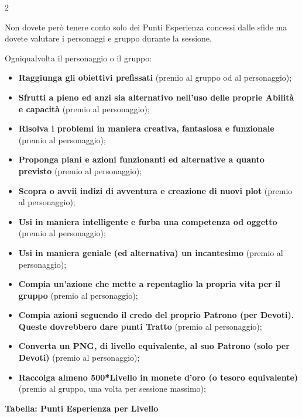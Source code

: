 \begin{multicols}{2}
\medskip

Non dovete però tenere conto solo dei Punti Esperienza concessi dalle sfide ma dovete valutare i personaggi e gruppo durante la sessione.

Ogniqualvolta il personaggio o il gruppo:\label{puntiesperienzabonus}
\begin{itemize}[leftmargin=*] \setlength{\itemsep}{0pt}
\item \textbf{Raggiunga gli obiettivi prefissati} (premio al gruppo od al personaggio);
\item \textbf{Sfrutti a pieno ed anzi sia alternativo nell'uso delle proprie Abilità e capacità} (premio al personaggio);
\item \textbf{Risolva i problemi in maniera creativa, fantasiosa e funzionale} (premio al personaggio);
\item \textbf{Proponga piani e azioni funzionanti ed alternative a quanto previsto} (premio al personaggio);
\item \textbf{Scopra o avvii indizi di avventura e creazione di nuovi plot} (premio al personaggio);
\item \textbf{Usi in maniera intelligente e furba una competenza od oggetto} (premio al personaggio);
\item \textbf{Usi in maniera geniale (ed alternativa) un incantesimo} (premio al personaggio);
\item \textbf{Compia un'azione che mette a repentaglio la propria vita per il gruppo} (premio al personaggio);
\item \textbf{Compia azioni seguendo il credo del proprio Patrono (per Devoti). Queste dovrebbero dare punti Tratto} (premio al personaggio);
\item \textbf{Converta un PNG, di livello equivalente, al suo Patrono (solo per Devoti)} (premio al personaggio);
\item \textbf{Raccolga almeno 500*Livello in monete d'oro (o tesoro equivalente)} (premio al gruppo, una volta per sessione massimo);
\end{itemize}

\medskip

\textbf{Tabella: Punti Esperienza per Livello}\label{tabellapuntiesperienza}


\end{multicols}
